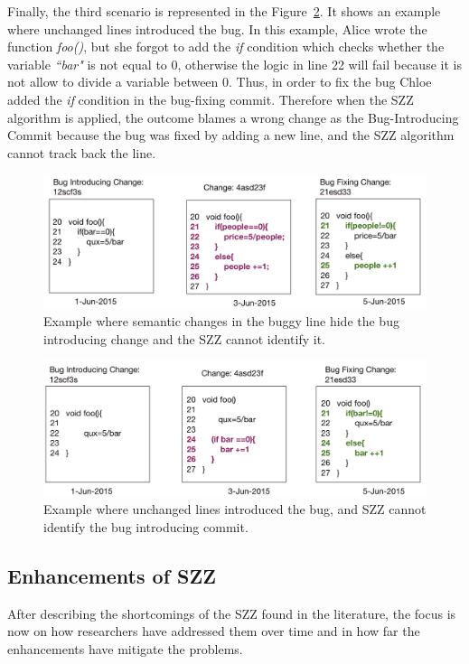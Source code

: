 \documentclass[a4paper, 12pt]{book}
\begin{document}
Finally, the third scenario is represented in the Figure~\ref{fig:code3}. It shows an example where unchanged lines introduced the bug. In this example, Alice wrote the function \emph{foo()}, but she forgot to add the \emph{if} condition which checks whether the variable \emph{``bar"} is not equal to 0, otherwise the logic in line 22 will fail because it is not allow to divide a variable between 0. Thus, in order to fix the bug Chloe added the \emph{if} condition in the bug-fixing commit. Therefore when the SZZ algorithm is applied, the outcome blames a wrong change as the Bug-Introducing Commit because the bug was fixed by adding a new line, and the SZZ algorithm cannot track back the line.

\begin{figure}
\centering
\includegraphics[width=\columnwidth]{img/code2.png}
\caption{Example where semantic changes in the buggy line hide the bug introducing change and the SZZ cannot identify it. }
\label{fig:code2}       %
\end{figure}

\begin{figure}
\centering
\includegraphics[width=\columnwidth]{img/code3.png}
\caption{Example where unchanged lines introduced the bug, and SZZ cannot identify the bug introducing commit.}
\label{fig:code3}       %
\end{figure}


\subsection{Enhancements of SZZ}
\label{subsec:Enhancements}
After describing the shortcomings of the SZZ found in the literature, the focus is now on how researchers have addressed them over time and in how far the enhancements have mitigate the problems.
\end{document}
